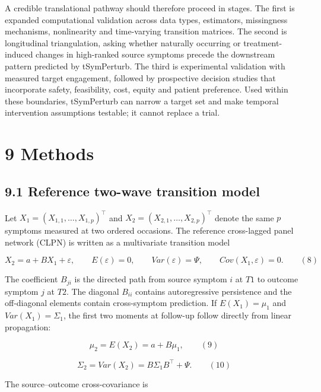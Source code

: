 \documentclass[11pt]{article}
\begin{document}
A credible translational pathway should therefore proceed in stages. The
first is expanded computational validation across data types,
estimators, missingness mechanisms, nonlinearity and time-varying
transition matrices. The second is longitudinal triangulation, asking
whether naturally occurring or treatment-induced changes in high-ranked
source symptoms precede the downstream pattern predicted by tSymPerturb.
The third is experimental validation with measured target engagement,
followed by prospective decision studies that incorporate safety,
feasibility, cost, equity and patient preference. Used within these
boundaries, tSymPerturb can narrow a target set and make temporal
intervention assumptions testable; it cannot replace a trial.

\section{9 Methods}\label{methods}

\subsection{9.1 Reference two-wave transition
model}\label{reference-two-wave-transition-model}

Let \(X_{1} = \left( X_{1,1},\ldots,X_{1,p} \right)^{\top}\) and
\(X_{2} = \left( X_{2,1},\ldots,X_{2,p} \right)^{\top}\) denote the same
\(p\) symptoms measured at two ordered occasions. The reference
cross-lagged panel network (CLPN) is written as a multivariate
transition model

\[X_{2} = a + BX_{1} + \varepsilon,\quad\quad E(\varepsilon) = 0,\quad\quad Var(\varepsilon) = \Psi,\quad\quad Cov\left( X_{1},\varepsilon \right) = 0.\quad\quad(8)\]

The coefficient \(B_{ji}\) is the directed path from source symptom
\(i\) at \(T1\) to outcome symptom \(j\) at \(T2\). The diagonal
\(B_{ii}\) contains autoregressive persistence and the off-diagonal
elements contain cross-symptom prediction. If
\(E\left( X_{1} \right) = \mu_{1}\) and
\(Var\left( X_{1} \right) = \Sigma_{1}\), the first two moments at
follow-up follow directly from linear propagation:

\[\mu_{2} = E\left( X_{2} \right) = a + B\mu_{1},\quad\quad(9)\]

\[\Sigma_{2} = Var\left( X_{2} \right) = B\Sigma_{1}B^{\top} + \Psi.\quad\quad(10)\]

The source--outcome cross-covariance is
\end{document}
